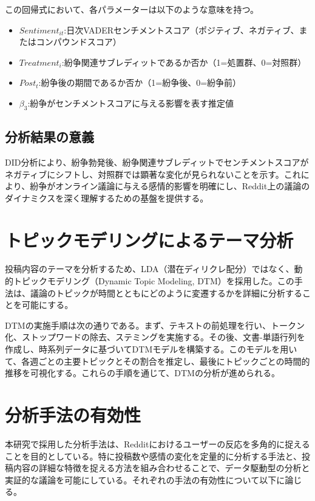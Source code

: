 \documentclass[11pt, a4j]{jreport}
\begin{document}
    この回帰式において、各パラメーターは以下のような意味を持つ。
    \begin{itemize}
        \item $Sentiment_{it}$:日次VADERセンチメントスコア（ポジティブ、ネガティブ、またはコンパウンドスコア）
        \item $Treatment_{i}$:紛争関連サブレディットであるか否か（1=処置群、0=対照群）
        \item $Post_{t}$:紛争後の期間であるか否か（1=紛争後、0=紛争前）
        \item $\beta_{3}$:紛争がセンチメントスコアに与える影響を表す推定値
    \end{itemize}

    \subsection{分析結果の意義}
    DID分析により、紛争勃発後、紛争関連サブレディットでセンチメントスコアがネガティブにシフトし、対照群では顕著な変化が見られないことを示す。これにより、紛争がオンライン議論に与える感情的影響を明確にし、Reddit上の議論のダイナミクスを深く理解するための基盤を提供する。

    \section{トピックモデリングによるテーマ分析}
    投稿内容のテーマを分析するため、LDA（潜在ディリクレ配分）ではなく、動的トピックモデリング（Dynamic Topic Modeling, DTM）を採用した。この手法は、議論のトピックが時間とともにどのように変遷するかを詳細に分析することを可能にする。

    DTMの実施手順は次の通りである。まず、テキストの前処理を行い、トークン化、ストップワードの除去、ステミングを実施する。その後、文書-単語行列を作成し、時系列データに基づいてDTMモデルを構築する。このモデルを用いて、各週ごとの主要トピックとその割合を推定し、最後にトピックごとの時間的推移を可視化する。これらの手順を通じて、DTMの分析が進められる。

    \section{分析手法の有効性}
    本研究で採用した分析手法は、Redditにおけるユーザーの反応を多角的に捉えることを目的としている。特に投稿数や感情の変化を定量的に分析する手法と、投稿内容の詳細な特徴を捉える方法を組み合わせることで、データ駆動型の分析と実証的な議論を可能にしている。それぞれの手法の有効性について以下に論じる。
\end{document}
